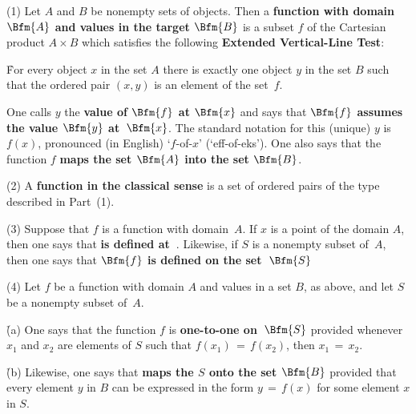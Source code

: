 \V

\hspace*{\parindent} (1) Let $A$ and $B$ be nonempty sets of objects. Then a {\bf function with domain~$\Bfm{A}$
    and values in the target $\Bfm{B}$} is a subset $f$ of the
    Cartesian product $A{\times}B$ which satisfies the following {\bf Extended Vertical-Line Test}:


\V

        \h For every object $x$ in the set $A$ there is exactly one object $y$ in the set $B$ such that the ordered pair $(x,y)$ is an element of the set~$f$.

\V

\noindent One calls $y$ the {\bf value of $\Bfm{f}$ at $\Bfm{x}$}
     and says that {\bf $\Bfm{f}$ assumes the value $\Bfm{y}$ at~$\Bfm{x}$}.
    The standard notation for this (unique) $y$ is $f(x)$, pronounced (in English)  `$f$-of-$x$' (`eff-of-eks'). One also says that
    the function $f$ {\bf maps the set $\Bfm{A}$ into the set $\Bfm{B}$}.

\V

        (2) A {\bf function in the classical sense} is a set of ordered pairs of the type described in Part~(1).

\V

        (3) Suppose that $f$ is a function with domain~$A$. If $x$ is a point of the domain $A$,
    then one says that {\bf {} is defined at~}.
    Likewise, if $S$ is a nonempty subset of~$A$, then one says that {\bf $\Bfm{f}$ is defined on the set~$\Bfm{S}$}



\V

        (4) Let $f$ be a function with domain $A$ and values in a set $B$, as above, and let $S$ be a nonempty subset of~$A$.

        \h (a) One says that the function $f$ is {\bf one-to-one on~$\Bfm{S}$}
    provided whenever $x_{1}$ and $x_{2}$ are elements of $S$ such that $f(x_{1}) \,=\, f(x_{2})$, then $x_{1} \,=\, x_{2}$.

        \h (b) Likewise, one says that {\bf {} maps the $S$ onto the set $\Bfm{B}$}
    provided that every element $y$ in $B$ can be expressed in the form $y \,=\, f(x)$ for some element $x$ in $S$.

